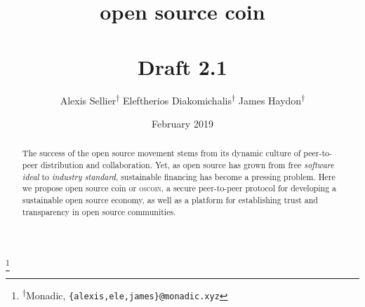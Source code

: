 \documentclass[a4paper, oneside, 10pt, final]{amsart}
\begin{document}
\title[open source coin]{open source coin \\ \vspace{0.5em} \\ {\tiny Draft 2.1}}
\author{\Small Alexis Sellier\textsuperscript{$\dagger$} \qquad Eleftherios Diakomichalis\textsuperscript{$\dagger$} \qquad James Haydon\textsuperscript{$\dagger$}}
\date{February 2019}

\thanks{\textsuperscript{$\dagger$}Monadic, \texttt{\{alexis,ele,james\}@monadic.xyz}}

\begin{abstract}
The success of the open source movement stems from its dynamic culture of
peer-to-peer distribution and collaboration. Yet, as open source has grown from
free \emph{software ideal} to \emph{industry standard}, sustainable financing
has become a pressing problem.  Here we propose open source coin or
\textsc{oscoin}, a secure peer-to-peer protocol for developing a sustainable
open source economy, as well as a platform for establishing trust and
transparency in open source communities.
\end{abstract}

\maketitle
\end{document}
